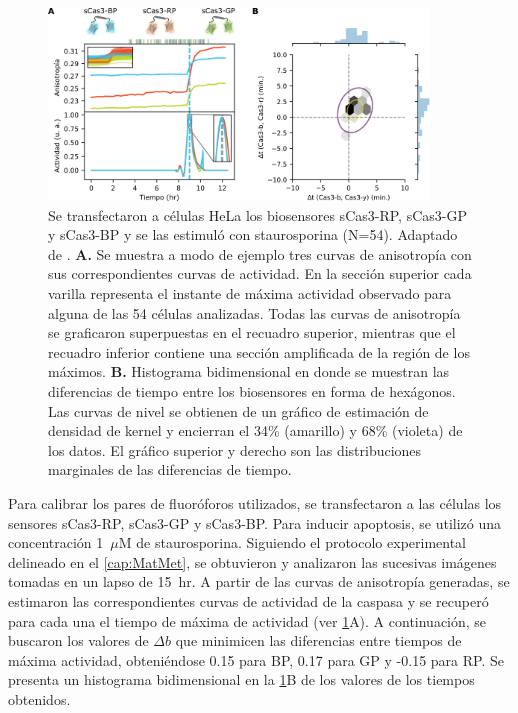 \begin{figure}
    \centering
    \includegraphics[width=0.9\textwidth]{img/cap_3/onecasp.png}
    \caption{\footnotesize{Se transfectaron a células HeLa los biosensores sCas3-RP, sCas3-GP y sCas3-BP y se las estimuló con staurosporina (N=54). Adaptado de \cite{Corbat2018}. \textbf{A.} Se muestra a modo de ejemplo tres curvas de anisotropía con sus correspondientes curvas de actividad. En la sección superior cada varilla representa el instante de máxima actividad observado para alguna de las 54 células analizadas. Todas las curvas de anisotropía se graficaron superpuestas en el recuadro superior, mientras que el recuadro inferior contiene una sección amplificada de la región de los máximos. \textbf{B.} Histograma bidimensional en donde se muestran las diferencias de tiempo entre los biosensores en forma de hexágonos. Las curvas de nivel se obtienen de un gráfico de estimación de densidad de kernel y encierran el 34\% (amarillo) y 68\% (violeta) de los datos. El gráfico superior y derecho son las distribuciones marginales de las diferencias de tiempo.}}
    \label{fig:onecasp}
\end{figure}

Para calibrar los pares de fluoróforos utilizados, se transfectaron a las células los sensores sCas3-RP, sCas3-GP y sCas3-BP. Para inducir apoptosis, se utilizó una concentración 1~$\mu$M de staurosporina. Siguiendo el protocolo experimental delineado en el \cref{cap:MatMet}, se obtuvieron y analizaron las sucesivas imágenes tomadas en un lapso de 15~hr. A partir de las curvas de anisotropía generadas, se estimaron las correspondientes curvas de actividad de la caspasa y se recuperó para cada una el tiempo de máxima de actividad (ver \cref{fig:onecasp}A). A continuación, se buscaron los valores de $\Delta b$ que minimicen las diferencias entre tiempos de máxima actividad, obteniéndose 0.15 para BP, 0.17 para GP y -0.15 para RP. Se presenta un histograma bidimensional en la \cref{fig:onecasp}B de los valores de los tiempos obtenidos.


